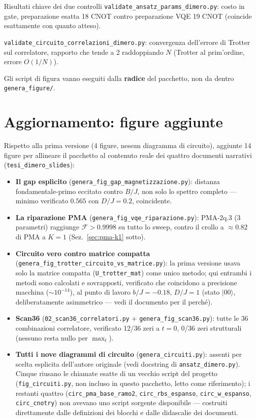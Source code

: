 \documentclass[11pt,a4paper]{article}
\newcommand{\ket}[1]{\lvert #1 \rangle}
\newcommand{\code}[1]{\texttt{\small #1}}
\begin{document}
\begin{okbox}{Risultati chiave dei due controlli}
\code{validate\_ansatz\_params\_dimero.py}: costo in gate, preparazione
esatta 18 CNOT contro preparazione VQE 19 CNOT (coincide esattamente
con quanto atteso).

\code{validate\_circuito\_correlazioni\_dimero.py}: convergenza
dell'errore di Trotter sul correlatore, rapporto che tende a 2
raddoppiando $N$ (Trotter al prim'ordine, errore $O(1/N)$).
\end{okbox}

Gli script di figura vanno eseguiti dalla \textbf{radice} del pacchetto,
non da dentro \code{genera\_figure/}.

\section{Aggiornamento: figure aggiunte}
\label{sec:aggiornamento}

Rispetto alla prima versione (4 figure, nessun diagramma di circuito),
aggiunte 14 figure per allineare il pacchetto al contenuto reale dei
quattro documenti narrativi (\texttt{tesi\_dimero\_slides}):

\begin{itemize}[leftmargin=1.4em,itemsep=3pt]
\item \textbf{Il gap esplicito}
(\code{genera\_fig\_gap\_magnetizzazione.py}): distanza
fondamentale-primo eccitato contro $B/J$, non solo lo spettro completo
--- minimo verificato $0.565$ con $D/J=0.2$, coincidente.
\item \textbf{La riparazione PMA}
(\code{genera\_fig\_vqe\_riparazione.py}): PMA-2q.3 (3 parametri)
raggiunge $\mathcal F>0.9998$ su tutto lo sweep, contro il crollo a
$\approx0.82$ di PMA a $K=1$ (Sez.~\ref{sec:pma-k1} sotto).
\item \textbf{Circuito vero contro matrice compatta}
(\code{genera\_fig\_trotter\_circuito\_vs\_matrice.py}): la prima
versione usava solo la matrice compatta (\code{U\_trotter\_mat}) come
unico metodo; qui entrambi i metodi sono calcolati e sovrapposti,
verificato che coincidono a precisione macchina ($\sim10^{-14}$), al
punto di lavoro $b/J=-0.18$, $D/J=1$ (stato $\ket{00}$, deliberatamente
asimmetrico --- vedi il documento per il perché).
\item \textbf{Scan36} (\code{02\_scan36\_correlatori.py} +
\code{genera\_fig\_scan36.py}): tutte le 36 combinazioni correlatore,
verificato 12/36 zeri a $t=0$, 0/36 zeri strutturali (nessuno resta
nullo per $\max_t$).
\item \textbf{Tutti i nove diagrammi di circuito}
(\code{genera\_circuiti.py}): assenti per scelta esplicita
dell'autore originale (vedi docstring di \code{ansatz\_dimero.py}).
Cinque riusano le chiamate esatte di un vecchio script del progetto
(\texttt{fig\_circuiti.py}, non incluso in questo pacchetto, letto come
riferimento); i restanti quattro (\code{circ\_pma\_base\_ramo2},
\code{circ\_rbs\_espanso}, \code{circ\_w\_espanso}, \code{circ\_cnotry})
non avevano uno script sorgente disponibile --- costruiti direttamente
dalle definizioni dei blocchi e dalle didascalie dei documenti.
\end{itemize}
\end{document}
